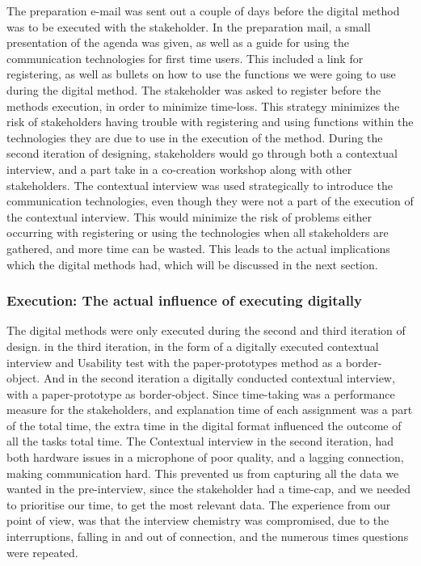 The preparation e-mail was sent out a couple of days before the digital method was to be executed with the stakeholder. In the preparation mail, a small presentation of the agenda was given, as well as a guide for using the communication technologies for first time users. This included a link for registering, as well as bullets on how to use the functions we were going to use during the digital method. The stakeholder was asked to register before the methods execution, in order to minimize time-loss. This strategy minimizes the risk of stakeholders having trouble with registering and using functions within the technologies they are due to use in the execution of the method.
During the second iteration of designing, stakeholders would go through both a contextual interview, and a part take in a co-creation workshop along with other stakeholders. The contextual interview was used strategically to introduce the communication technologies, even though they were not a part of the execution of the contextual interview. This would minimize the risk of problems either occurring with registering or using the technologies when all stakeholders are gathered, and more time can be wasted.
This leads to the actual implications which the digital methods had, which will be discussed in the next section.

\subsubsection{Execution: The actual influence of executing digitally}

The digital methods were only executed during the second and third iteration of design. in the third iteration, in the form of a digitally executed contextual interview and Usability test with the paper-prototypes method as a border-object. And in the second iteration a digitally conducted contextual interview, with a paper-prototype as border-object. Since time-taking was a performance measure for the stakeholders, and explanation time of each assignment was a part of the total time, the extra time in the digital format influenced the outcome of all the tasks total time. The Contextual interview in the second iteration, had both hardware issues in a microphone of poor quality, and a lagging connection, making communication hard. This prevented us from capturing all the data we wanted in the pre-interview, since the stakeholder had a time-cap, and we needed to prioritise our time, to get the most relevant data. The experience from our point of view, was that the interview chemistry was compromised, due to the interruptions, falling in and out of connection, and the numerous times questions were repeated. 

